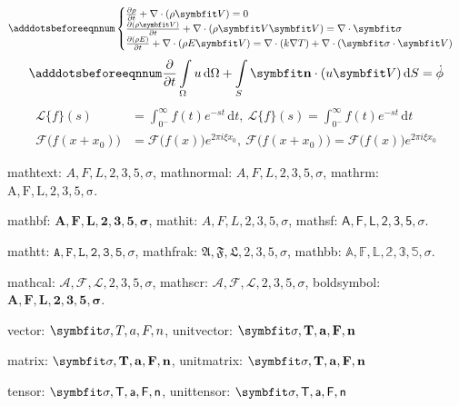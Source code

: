 \begin{equation} \label{eq:appedns}
    \adddotsbeforeeqnnum%
    \begin{cases}
        \frac{\partial \rho}{\partial t} + \nabla\cdot(\rho\Vector{V}) = 0\\
        \frac{\partial (\rho\Vector{V})}{\partial t} + \nabla\cdot(\rho\Vector{V}\Vector{V}) = \nabla\cdot\Tensor{\sigma}\\
        \frac{\partial (\rho E)}{\partial t} + \nabla\cdot(\rho E\Vector{V}) = \nabla\cdot(k\nabla T) + \nabla\cdot(\Tensor{\sigma}\cdot\Vector{V})
    \end{cases}
\end{equation}
\begin{equation}
    \adddotsbeforeeqnnum%
    \frac{\partial }{\partial t}\int\limits_{\Omega} u \, \mathrm{d}\Omega + \int\limits_{S} \unitVector{n}\cdot(u\Vector{V}) \, \mathrm{d}S = \dot{\phi}
\end{equation}
\[
    \begin{split}
        \mathcal{L} \{f\}(s) &= \int _{0^{-}}^{\infty} f(t) e^{-st} \, \mathrm{d}t, \ 
        \mathscr{L} \{f\}(s) = \int _{0^{-}}^{\infty} f(t) e^{-st} \, \mathrm{d}t\\
        \mathcal{F} {\bigl (} f(x+x_{0}) {\bigr )} &= \mathcal{F} {\bigl (} f(x) {\bigr )} e^{2\pi i\xi x_{0}}, \ 
        \mathscr{F} {\bigl (} f(x+x_{0}) {\bigr )} = \mathscr{F} {\bigl (} f(x) {\bigr )} e^{2\pi i\xi x_{0}}
    \end{split}
\]

mathtext: $A,F,L,2,3,5,\sigma$, mathnormal: $A,F,L,2,3,5,\sigma$, mathrm: $\mathrm{A,F,L,2,3,5,\sigma}$.

mathbf: $\mathbf{A,F,L,2,3,5,\sigma}$, mathit: $\mathit{A,F,L,2,3,5,\sigma}$, mathsf: $\mathsf{A,F,L,2,3,5,\sigma}$.

mathtt: $\mathtt{A,F,L,2,3,5,\sigma}$, mathfrak: $\mathfrak{A,F,L,2,3,5,\sigma}$, mathbb: $\mathbb{A,F,L,2,3,5,\sigma}$.

mathcal: $\mathcal{A,F,L,2,3,5,\sigma}$, mathscr: $\mathscr{A,F,L,2,3,5,\sigma}$, boldsymbol: $\boldsymbol{A,F,L,2,3,5,\sigma}$.

vector: $\Vector{\sigma, T, a, F, n}$, unitvector: $\unitVector{\sigma, T, a, F, n}$

matrix: $\Matrix{\sigma, T, a, F, n}$, unitmatrix: $\unitMatrix{\sigma, T, a, F, n}$

tensor: $\Tensor{\sigma, T, a, F, n}$, unittensor: $\unitTensor{\sigma, T, a, F, n}$ 

